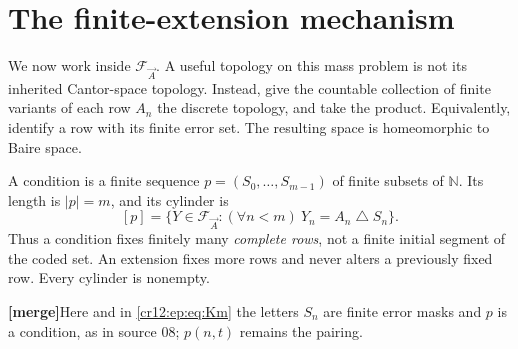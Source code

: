 \documentclass[11pt,letterpaper]{article}
\theoremstyle{plain}
\theoremstyle{definition}
\theoremstyle{remark}
\numberwithin{equation}{section}
\newcommand{\N}{\mathbb N}
\newcommand{\sd}{\mathbin{\triangle}}
\newcommand{\mergenote}[1]{\par\smallskip\noindent
 {\small\textsf{\textbf{[merge]}}\enspace #1}\par\smallskip}
\newcommand{\FF}{\mathcal F}             %
\begin{document}
\section{The finite-extension mechanism}\label{cr12:ep:sec:forcing}
We now work inside $\FF_{\vec A}$. A useful topology on this mass problem is not its
inherited Cantor-space topology. Instead, give the countable collection of finite
variants of each row $A_n$ the discrete topology, and take the product.
Equivalently, identify a row with its finite error set. The resulting space is
homeomorphic to Baire space.

A condition is a finite sequence $p=(S_0,\ldots,S_{m-1})$ of finite subsets of $\N$.
Its length is $|p|=m$, and its cylinder is
\begin{equation}\label{cr12:ep:eq:cylinder}
 [p]=\{Y\in\FF_{\vec A}:(\forall n<m)\ Y_n=A_n\sd S_n\}.
\end{equation}
Thus a condition fixes finitely many \emph{complete rows}, not a finite initial
segment of the coded set. An extension fixes more rows and never alters a
previously fixed row. Every cylinder is nonempty.

\mergenote{Here and in \eqref{cr12:ep:eq:Km} the letters $S_n$ are finite error masks
and $p$ is a condition, as in source 08; $p(n,t)$ remains the pairing.}
\end{document}
